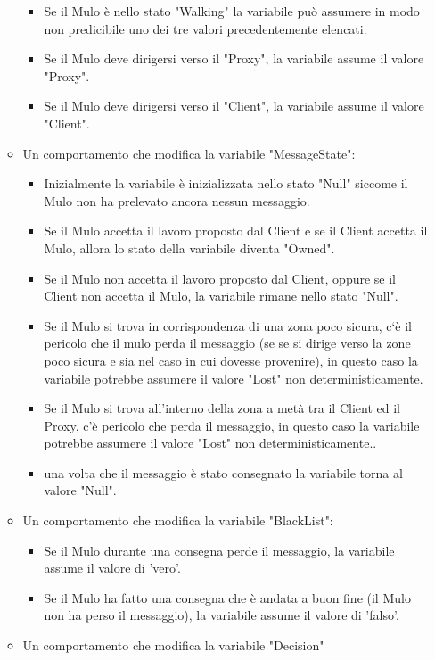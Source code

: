 \documentclass[13pt,a4paper]{article}
\begin{document}
\begin{itemize}
\begin{itemize}
		\begin{itemize}
			\item Se il Mulo è nello stato "Walking" la variabile può assumere in modo non predicibile uno dei tre valori precedentemente elencati. 
			\item Se il Mulo deve dirigersi verso il "Proxy", la variabile assume il valore "Proxy".
			\item Se il Mulo deve dirigersi verso il "Client", la variabile assume il valore "Client".
		\end{itemize}
	\item Un comportamento che modifica la variabile "MessageState":
	\begin{itemize}
		\item Inizialmente la variabile è inizializzata nello stato "Null" siccome il Mulo non ha prelevato ancora nessun messaggio.
		\item Se il Mulo accetta il lavoro proposto dal Client e se il Client  accetta il Mulo, allora lo stato della variabile diventa "Owned".
		\item Se il Mulo non accetta il lavoro proposto dal Client, oppure se il Client non accetta il Mulo,  la variabile rimane nello stato "Null".
		\item Se il Mulo si trova in corrispondenza di una zona poco sicura, c`è il pericolo che il mulo perda il messaggio (se se si dirige verso la zone poco sicura e sia nel caso in cui dovesse provenire), in questo caso la variabile potrebbe assumere il valore "Lost" non deterministicamente.
		\item Se il Mulo si trova all'interno della zona a metà tra il Client ed il Proxy, c'è pericolo che perda il messaggio, in questo caso la variabile potrebbe assumere il valore "Lost" non deterministicamente..
		\item una volta che il messaggio è stato consegnato la variabile torna al valore "Null".
	\end{itemize}
	\item Un comportamento che modifica la variabile "BlackList":
	\begin{itemize}
		\item Se il Mulo durante una consegna perde il messaggio, la variabile assume il valore di 'vero'.
		\item Se il Mulo ha fatto una consegna che è andata a buon fine (il Mulo non ha perso il messaggio), la variabile assume il valore di 'falso'.
	\end{itemize} 
	\item Un comportamento che modifica la variabile "Decision"

\end{itemize}
\end{itemize}
\end{document}
